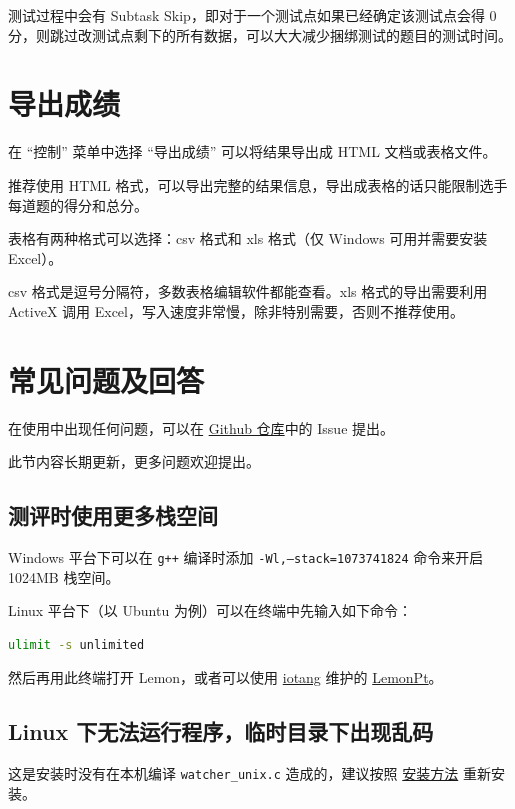 \documentclass[12pt, a4paper]{article}
\begin{document}
测试过程中会有 Subtask Skip，即对于一个测试点如果已经确定该测试点会得 0 分，则跳过改测试点剩下的所有数据，可以大大减少捆绑测试的题目的测试时间。

\section{导出成绩}
在 “控制” 菜单中选择 “导出成绩” 可以将结果导出成 HTML 文档或表格文件。

推荐使用 HTML 格式，可以导出完整的结果信息，导出成表格的话只能限制选手每道题的得分和总分。

表格有两种格式可以选择：csv 格式和 xls 格式（仅 Windows 可用并需要安装 Excel）。

csv 格式是逗号分隔符，多数表格编辑软件都能查看。xls 格式的导出需要利用 ActiveX 调用 Excel，写入速度非常慢，除非特别需要，否则不推荐使用。

\section{常见问题及回答}
在使用中出现任何问题，可以在 \href{https://github.com/Dust1404/Project_LemonPlus}{Github 仓库}中的 Issue 提出。

此节内容长期更新，更多问题欢迎提出。

\subsection{测评时使用更多栈空间}
Windows 平台下可以在 \texttt{g++} 编译时添加 \texttt{-Wl,--stack=1073741824} 命令来开启 1024MB 栈空间。

Linux 平台下（以 Ubuntu 为例）可以在终端中先输入如下命令：
\begin{lstlisting}[language=bash,frame=shadowbox,basicstyle=\ttfamily]
ulimit -s unlimited
\end{lstlisting}

然后再用此终端打开 Lemon，或者可以使用 \href{https://github.com/iotang}{iotang} 维护的 \href{https://github.com/iotang/Project_LemonPt}{LemonPt}。

\subsection{Linux 下无法运行程序，临时目录下出现乱码}
这是安装时没有在本机编译 \texttt{watcher\_unix.c} 造成的，建议按照 \hyperref[linux install]{安装方法} 重新安装。
\end{document}
